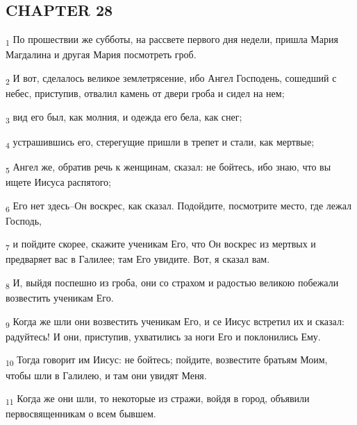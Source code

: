 \subsection{CHAPTER 28}
\begin{tcolorbox}
\textsubscript{1} По прошествии же субботы, на рассвете первого дня недели, пришла Мария Магдалина и другая Мария посмотреть гроб.
\end{tcolorbox}
\begin{tcolorbox}
\textsubscript{2} И вот, сделалось великое землетрясение, ибо Ангел Господень, сошедший с небес, приступив, отвалил камень от двери гроба и сидел на нем;
\end{tcolorbox}
\begin{tcolorbox}
\textsubscript{3} вид его был, как молния, и одежда его бела, как снег;
\end{tcolorbox}
\begin{tcolorbox}
\textsubscript{4} устрашившись его, стерегущие пришли в трепет и стали, как мертвые;
\end{tcolorbox}
\begin{tcolorbox}
\textsubscript{5} Ангел же, обратив речь к женщинам, сказал: не бойтесь, ибо знаю, что вы ищете Иисуса распятого;
\end{tcolorbox}
\begin{tcolorbox}
\textsubscript{6} Его нет здесь--Он воскрес, как сказал. Подойдите, посмотрите место, где лежал Господь,
\end{tcolorbox}
\begin{tcolorbox}
\textsubscript{7} и пойдите скорее, скажите ученикам Его, что Он воскрес из мертвых и предваряет вас в Галилее; там Его увидите. Вот, я сказал вам.
\end{tcolorbox}
\begin{tcolorbox}
\textsubscript{8} И, выйдя поспешно из гроба, они со страхом и радостью великою побежали возвестить ученикам Его.
\end{tcolorbox}
\begin{tcolorbox}
\textsubscript{9} Когда же шли они возвестить ученикам Его, и се Иисус встретил их и сказал: радуйтесь! И они, приступив, ухватились за ноги Его и поклонились Ему.
\end{tcolorbox}
\begin{tcolorbox}
\textsubscript{10} Тогда говорит им Иисус: не бойтесь; пойдите, возвестите братьям Моим, чтобы шли в Галилею, и там они увидят Меня.
\end{tcolorbox}
\begin{tcolorbox}
\textsubscript{11} Когда же они шли, то некоторые из стражи, войдя в город, объявили первосвященникам о всем бывшем.
\end{tcolorbox}
